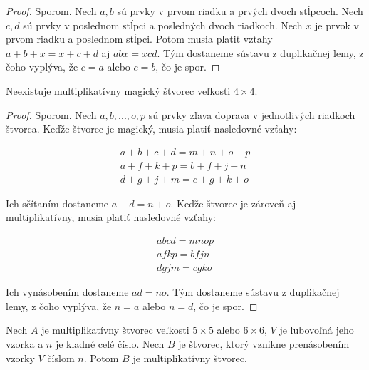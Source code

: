\begin{proof} Sporom. Nech $a,b$ sú prvky v prvom riadku a prvých dvoch stĺpcoch. Nech $c,d$ sú prvky v poslednom stĺpci a posledných dvoch riadkoch. Nech $x$ je prvok v prvom riadku a poslednom stĺpci. Potom musia platiť vzťahy $a + b + x = x + c + d$ aj $abx = xcd$. Tým dostaneme sústavu z duplikačnej lemy, z čoho vyplýva, že $c = a$ alebo $c = b$, čo je spor.
\end{proof}

\begin{theorem} Neexistuje multiplikatívny magický štvorec veľkosti $4 \times 4$.
\end{theorem} 

\begin{proof} Sporom. Nech $a, b, ... , o, p$ sú prvky zľava doprava v jednotlivých riadkoch štvorca. Keďže štvorec je magický, musia platiť nasledovné vzťahy:

\begin{gather}
a + b + c + d = m + n + o + p \\
a + f + k + p = b + f + j + n \\
d + g + j + m = c + g + k + o
\end{gather}

Ich sčítaním dostaneme $a + d = n + o$. Keďže štvorec je zároveň aj multiplikatívny, musia platiť nasledovné vzťahy:

\begin{gather}
abcd = mnop \\
afkp = bfjn \\
dgjm = cgko
\end{gather}

Ich vynásobením dostaneme $ad = no$. Tým dostaneme sústavu z duplikačnej lemy, z čoho vyplýva, že $n = a$ alebo $n = d$, čo je spor.
\end{proof}

\begin{theorem}
\label{addmultsquarepattern}
Nech $A$ je multiplikatívny štvorec veľkosti $5 \times 5$ alebo $6 \times 6$, $V$ je ľubovoľná jeho vzorka a $n$ je kladné celé číslo. Nech $B$ je štvorec, ktorý vznikne prenásobením vzorky $V$ číslom $n$. Potom $B$ je multiplikatívny štvorec.
\end{theorem}

